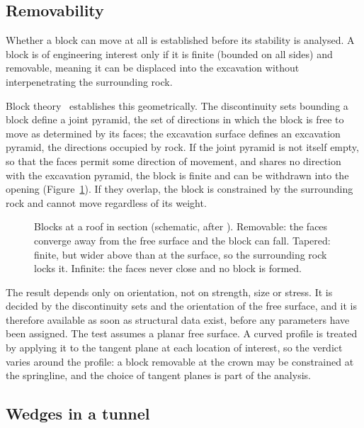 \subsection{Removability}
\label{sec:removability-projection}

Whether a block can move at all is established before its stability is
analysed. A block is of engineering interest only if it is finite (bounded on all sides)
and removable, meaning it can be displaced into the excavation without
interpenetrating the surrounding rock.

Block theory~\citep{goodman1985block} establishes this geometrically. The discontinuity sets bounding a
block define a joint pyramid, the set of directions in which the block is free
to move as determined by its faces; the excavation surface defines an
excavation pyramid, the directions occupied by rock. If the joint pyramid is
not itself empty, so that the faces permit some direction of movement, and
shares no direction with the excavation pyramid, the block is finite and can
be withdrawn into the opening (Figure~\ref{fig:block-removability}). If they
overlap, the block is
constrained by the surrounding rock and cannot move regardless of its weight.

\begin{figure}[htbp]
\centering
{}
\caption{Blocks at a roof in section (schematic, after \citet{goodman1985block}). Removable: the faces converge away from the free surface and the block can fall. Tapered: finite, but wider above than at the surface, so the surrounding rock locks it. Infinite: the faces never close and no block is formed.}
\label{fig:block-removability}
\end{figure}

The result depends only on orientation, not on
strength, size or stress. It is decided by the discontinuity sets and the
orientation of the free surface, and it is therefore available as soon as
structural data exist, before any parameters have been assigned. The test
assumes a planar free surface. A curved profile is treated by applying it to
the tangent plane at each location of interest, so the verdict varies around
the profile: a block removable at the crown may be constrained at the
springline, and the choice of tangent planes is part of the analysis.

\subsection{Wedges in a tunnel}
\label{sec:tunnel-wedges}

